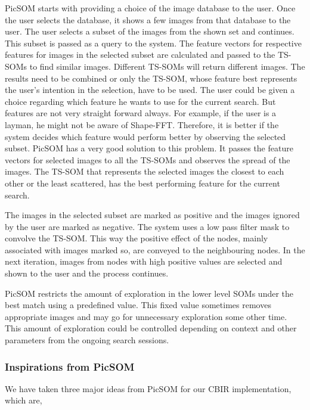 \documentclass[english]{tktltiki}
\begin{document}
PicSOM starts with providing a choice of the image database to the user. Once the user selects the database, it shows a few images from that database to the user. The user selects a subset of the images from the shown set and continues. This subset is passed as a query to the system. The feature vectors for respective features for images in the selected subset are calculated and passed to the TS-SOMs to find similar images. Different TS-SOMs will return different images. The results need to be combined or only the TS-SOM, whose feature best represents the user's intention in the selection, have to be used. The user could be given a choice regarding which feature he wants to use for the current search. But features are not very straight forward always. For example, if the user is a layman, he might not be aware of Shape-FFT. Therefore, it is better if the system decides which feature would perform better by observing the selected subset. PicSOM has a very good solution to this problem. It passes the feature vectors for selected images to all the TS-SOMs and observes the spread of the images. The TS-SOM that represents the selected images the closest to each other or the least scattered, has the best performing feature for the current search.

The images in the selected subset are marked as positive and the images ignored by the user are marked as negative. The system uses a low pass filter mask to convolve the TS-SOM. This way the positive effect of the nodes, mainly associated with images marked so, are conveyed to the neighbouring nodes. In the next iteration, images from nodes with high positive values are selected and shown to the user and the process continues.

PicSOM restricts the amount of exploration in the lower level SOMs under the best match using a predefined value. This fixed value sometimes removes appropriate images and may go for unnecessary exploration some other time. This amount of exploration could be controlled depending on context and other parameters from the ongoing search sessions.

\subsubsection{Inspirations from PicSOM}

We have taken three major ideas from PicSOM for our CBIR implementation, which are,
\end{document}
